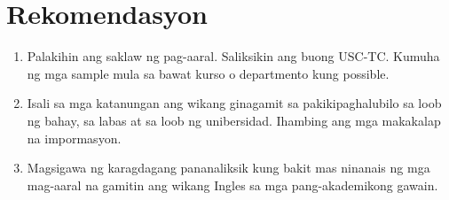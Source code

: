 \documentclass [11pt] {report}
\begin{document}
\section{Rekomendasyon}
\begin{enumerate}
\item Palakihin ang saklaw ng pag-aaral. Saliksikin ang buong USC-TC. Kumuha ng
  mga sample mula sa bawat kurso o departmento kung possible.
\item Isali sa mga katanungan ang wikang ginagamit sa pakikipaghalubilo sa loob
  ng bahay, sa labas at sa loob ng unibersidad. Ihambing ang mga makakalap na
  impormasyon.
\item Magsigawa ng karagdagang pananaliksik kung bakit mas ninanais ng mga
  mag-aaral na gamitin ang wikang Ingles sa mga pang-akademikong gawain.
\end{enumerate}
 


\end{document}
